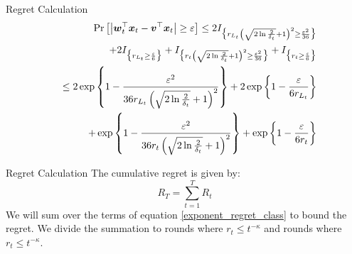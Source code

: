 \documentclass{beamer}
\begin{document}
\begin{frame}{Regret Calculation}
\begin{eqnarray}
&&{\rm Pr}\left[{\left|{{\boldsymbol{w}}}^{\top}_{t}{\boldsymbol{x}}_{t}-{{\boldsymbol{v}}}^{\top}{\boldsymbol{x}}_{t}\right|\geq\varepsilon}\right]\leq 2I_{\big\{r_{L_t}\left(\sqrt{2\ln{\frac{2}{\delta_t}}}+1\right)^2\geq\frac{\varepsilon^2}{36}\big\}}\\
&&+2I_{\big\{r_{L_t}\geq\frac{\varepsilon}{6}\big\}}+I_{\big\{r_t\left(\sqrt{2\ln{\frac{2}{\delta_t}}}+1\right)^2\geq\frac{\varepsilon^2}{36}\big\}}+I_{\big\{r_t\geq\frac{\varepsilon}{6}\big\}}\nonumber\\
&&\leq2\exp\left\{1-\frac{\varepsilon^2}{36r_{L_t}\left(\sqrt{2\ln{\frac{2}{\delta_t}}}+1\right)^2}\right\}+2\exp\left\{1-\frac{\varepsilon}{6r_{L_t}}\right\}\nonumber\\
&&+\exp\left\{1-\frac{\varepsilon^2}{36r_t\left(\sqrt{2\ln{\frac{2}{\delta_t}}}+1\right)^2}\right\}+\exp\left\{1-\frac{\varepsilon}{6r_t}\right\}\nonumber
\label{exponent_regret_class}
\end{eqnarray}
\end{frame}

\begin{frame}{Regret Calculation}
The cumulative regret is given by:
\begin{equation}
R_T=\sum\limits_{t=1}^{T}R_t
\label{cum_reg_define}
\end{equation}
We will sum over the terms of equation \ref{exponent_regret_class} to bound the regret.\newline\newline
We divide the summation to rounds where $r_t\leq t^{-\kappa}$ and rounds where $r_t\leq t^{-\kappa}$.
\end{frame}
\end{document}
